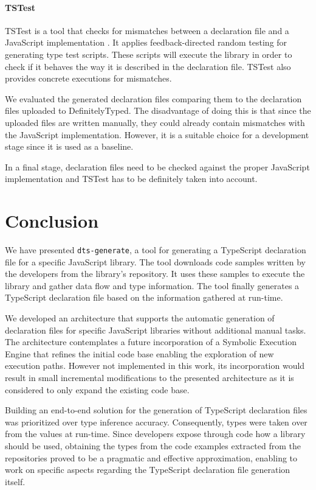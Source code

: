 \documentclass[english,cleveref,autoref,submission]{programming}
\begin{document}
\paragraph*{TSTest}
TSTest is a tool that checks for mismatches between a declaration file and a JavaScript implementation \cite{DBLP:journals/pacmpl/KristensenM17}. It applies feedback-directed random testing for generating type test scripts. These scripts will execute the library in order to check if it behaves the way it is described in the declaration file. TSTest also provides concrete executions for mismatches.

We evaluated the generated declaration files comparing them to the declaration files uploaded to DefinitelyTyped. The disadvantage of doing this is that since the uploaded files are written manually, they could already contain mismatches with the JavaScript implementation. However, it is a suitable choice for a development stage since it is used as a baseline.

In a final stage, declaration files need to be checked against the proper JavaScript implementation and TSTest has to be definitely taken into account.

\section{Conclusion}
\label{sec:conclusion}
We have presented \texttt{dts-generate}, a tool for generating a TypeScript declaration file for a specific JavaScript library. The tool downloads code samples written by the developers from the library's repository. It uses these samples to execute the library and gather data flow and type information. The tool finally generates a TypeScript declaration file based on the information gathered at run-time.

We developed an architecture that supports the automatic generation of declaration files for specific JavaScript libraries without additional manual tasks. The architecture contemplates a future incorporation of a Symbolic Execution Engine that refines the initial code base enabling the exploration of new execution paths. However not implemented in this work, its incorporation would result in small incremental modifications to the presented architecture as it is considered to only expand the existing code base.

Building an end-to-end solution for the generation of TypeScript declaration files was prioritized over type inference accuracy. Consequently, types were taken over from the values at run-time. Since developers expose through code how a library should be used, obtaining the types from the code examples extracted from the repositories proved to be a pragmatic and effective approximation, enabling to work on specific aspects regarding the TypeScript declaration file generation itself.
\end{document}
